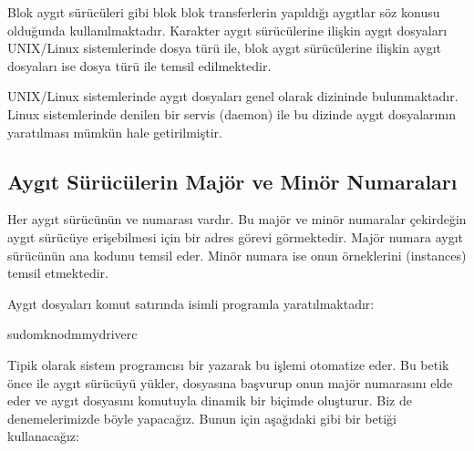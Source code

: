 \documentclass[a4paper,10pt,turkish]{sphinxmanual}
\begin{document}
\sphinxAtStartPar
Blok aygıt sürücüleri  gibi blok blok transferlerin yapıldığı aygıtlar
söz konusu olduğunda kullanılmaktadır. Karakter aygıt sürücülerine ilişkin aygıt dosyaları UNIX/Linux
sistemlerinde  dosya türü ile, blok aygıt sürücülerine ilişkin aygıt dosyaları ise  dosya türü
ile temsil edilmektedir.

\sphinxAtStartPar
UNIX/Linux sistemlerinde aygıt dosyaları genel olarak  dizininde bulunmaktadır. Linux
sistemlerinde  denilen bir servis (daemon) ile bu dizinde aygıt dosyalarının yaratılması mümkün
hale getirilmiştir.


\subsection{Aygıt Sürücülerin Majör ve Minör Numaraları}
\label{\detokenize{processcontrolblock:aygit-suruculerin-major-ve-minor-numaralari}}
\sphinxAtStartPar
Her aygıt sürücünün  ve  numarası vardır. Bu majör ve minör numaralar çekirdeğin aygıt
sürücüye erişebilmesi için bir adres görevi görmektedir. Majör numara aygıt sürücünün ana kodunu temsil
eder. Minör numara ise onun örneklerini (instances) temsil etmektedir.

\sphinxAtStartPar
Aygıt dosyaları komut satırında  isimli programla yaratılmaktadır:

\begin{sphinxVerbatim}[commandchars=\\\{\}]
\PYGZdl{}sudomknod\PYGZhy{}mmydriverc
\end{sphinxVerbatim}

\sphinxAtStartPar
Tipik olarak sistem programcısı bir  yazarak bu işlemi otomatize eder. Bu
betik önce  ile aygıt sürücüyü yükler,  dosyasına başvurup onun majör numarasını
elde eder ve aygıt dosyasını  komutuyla dinamik bir biçimde oluşturur. Biz de denemelerimizde
böyle yapacağız. Bunun için aşağıdaki gibi bir  betiği kullanacağız:
\end{document}
